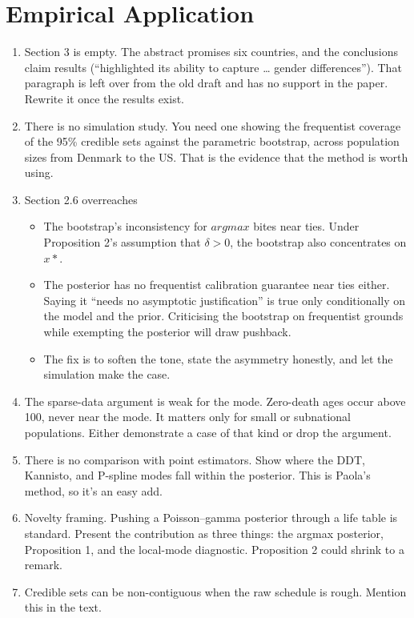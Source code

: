 \documentclass[12pt, letterpaper]{article}
\begin{document}
\section{Empirical Application}
{\color{red}
\begin{enumerate}
    \item Section 3 is empty. The abstract promises six countries, and the conclusions claim results (“highlighted its ability to capture … gender differences”). That paragraph is left over from the old draft and has no support in the paper. Rewrite it once the results exist.

    \item There is no simulation study. You need one showing the frequentist coverage of the 95\% credible sets against the parametric bootstrap, across population sizes from Denmark to the US. That is the evidence that the method is worth using.

    \item Section 2.6 overreaches
    \begin{itemize}
        \item The bootstrap’s inconsistency for $argmax$ bites near ties. Under Proposition 2’s assumption that $\delta > 0$, the bootstrap also concentrates on $x*$.

        \item The posterior has no frequentist calibration guarantee near ties either. Saying it “needs no asymptotic justification” is true only conditionally on the model and the prior. Criticising the bootstrap on frequentist grounds while exempting the posterior will draw pushback.

        \item The fix is to soften the tone, state the asymmetry honestly, and let the simulation make the case.
    \end{itemize}

    \item The sparse-data argument is weak for the mode. Zero-death ages occur above 100, never near the mode. It matters only for small or subnational populations. Either demonstrate a case of that kind or drop the argument.

    \item There is no comparison with point estimators. Show where the DDT, Kannisto, and P-spline modes fall within the posterior. This is Paola’s method, so it’s an easy add.

    \item Novelty framing. Pushing a Poisson–gamma posterior through a life table is standard. Present the contribution as three things: the argmax posterior, Proposition 1, and the local-mode diagnostic. Proposition 2 could shrink to a remark.

    \item Credible sets can be non-contiguous when the raw schedule is rough. Mention this in the text.
\end{enumerate}
}
\end{document}
